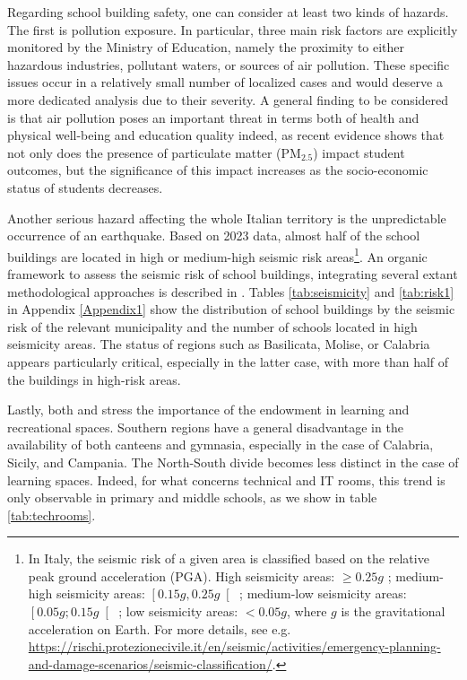 \documentclass[openany]{book}
\begin{document}
Regarding school building safety, one can consider at least two kinds of hazards. The first is pollution exposure. In particular, three main risk factors are explicitly monitored by the Ministry of Education, namely the proximity to either hazardous industries, pollutant waters, or sources of air pollution. These specific issues occur in a relatively small number of localized cases and would deserve a more dedicated analysis due to their severity. A general finding to be considered is that air pollution poses an important threat in terms both of health and physical well-being and education quality indeed, as recent evidence \citep{AQInvalsi} shows that not only does the presence of particulate matter (PM$_{2.5}$)  impact student outcomes, but the significance of this impact increases as the socio-economic status of students decreases.

Another serious hazard affecting the whole Italian territory is the unpredictable occurrence of an earthquake. Based on 2023 data, almost half of the school buildings are located in high or medium-high seismic risk areas\footnote{In Italy, the seismic risk of a given area is classified based on the relative peak ground acceleration (PGA). High seismicity areas: $\geq 0.25 g$ ; medium-high seismicity areas: $\left[ 0.15g, 0.25 g \right[$ ; medium-low seismicity areas: $\left[ 0.05g; 0.15 g \right[$ ; low seismicity areas: $< 0.05 g$, where $g$ is the gravitational acceleration on Earth. For more details, see e.g. \url{https://rischi.protezionecivile.it/en/seismic/activities/emergency-planning-and-damage-scenarios/seismic-classification/}.}. An organic framework to assess the seismic risk of school buildings, integrating several extant methodological approaches is described in \cite{MARS}. Tables \ref{tab:seismicity} and \ref{tab:risk1} in Appendix \ref{Appendix1} show the distribution of school buildings by the seismic risk of the relevant municipality and the number of schools located in high seismicity areas. The status of regions such as Basilicata, Molise, or Calabria appears particularly critical, especially in the latter case, with more than half of the buildings in high-risk areas. 

Lastly, both \cite{Garlaschi} and \cite{BDI} stress the importance of the endowment in learning and recreational spaces. Southern regions have a general disadvantage in the availability of both canteens and gymnasia, especially in the case of Calabria, Sicily, and Campania. The North-South divide becomes less distinct in the case of learning spaces. Indeed, for what concerns technical and IT rooms, this trend is only observable in primary and middle schools, as we show in table \ref{tab:techrooms}.
\end{document}
